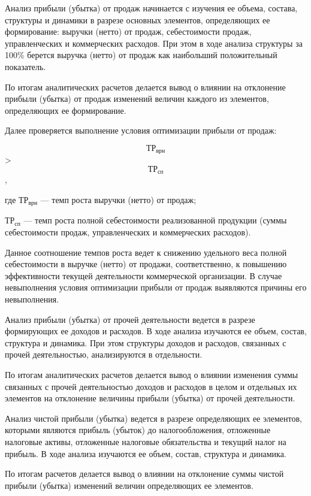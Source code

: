 Анализ прибыли (убытка) от продаж начинается с изучения ее объема, состава, структуры и динамики в разрезе основных элементов, определяющих ее формирование: выручки (нетто) от продаж, себестоимости продаж, управленческих и коммерческих расходов. При этом в ходе анализа структуры за 100\% берется выручка (нетто) от продаж как наибольший положительный показатель.

По итогам аналитических расчетов делается вывод о влиянии на отклонение прибыли (убытка) от продаж изменений величин каждого из элементов, определяющих ее формирование.

Далее проверяется выполнение условия оптимизации прибыли от продаж:

$$\text{ТР}_{\text{врн}}$$ > $$\text{ТР}_{\text{сп}}$$,

где $\text{ТР}_{\text{врн}}$ — темп роста выручки (нетто) от продаж;

$\text{ТР}_{\text{сп}}$ — темп роста полной себестоимости реализованной продукции (суммы себестоимости продаж, управленческих и коммерческих расходов).

Данное соотношение темпов роста ведет к снижению удельного веса полной себестоимости в выручке (нетто) от продажи, соответственно, к повышению эффективности текущей деятельности коммерческой организации. В случае невыполнения условия оптимизации прибыли от продаж выявляются причины его невыполнения.

Анализ прибыли (убытка) от прочей деятельности ведется в разрезе формирующих ее доходов и расходов. В ходе анализа изучаются ее объем, состав, структура и динамика. При этом структуры доходов и расходов, связанных с прочей деятельностью, анализируются в отдельности.

По итогам аналитических расчетов делается вывод о влиянии изменения суммы связанных с прочей деятельностью доходов и расходов в целом и отдельных их элементов на отклонение величины прибыли (убытка) от прочей деятельности.

Анализ чистой прибыли (убытка) ведется в разрезе определяющих ее элементов, которыми являются прибыль (убыток) до налогообложения, отложенные налоговые активы, отложенные налоговые обязательства и текущий налог на прибыль. В ходе анализа изучаются ее объем, состав, структура и динамика.

По итогам расчетов делается вывод о влиянии на отклонение суммы чистой прибыли (убытка) изменений величин определяющих ее элементов.